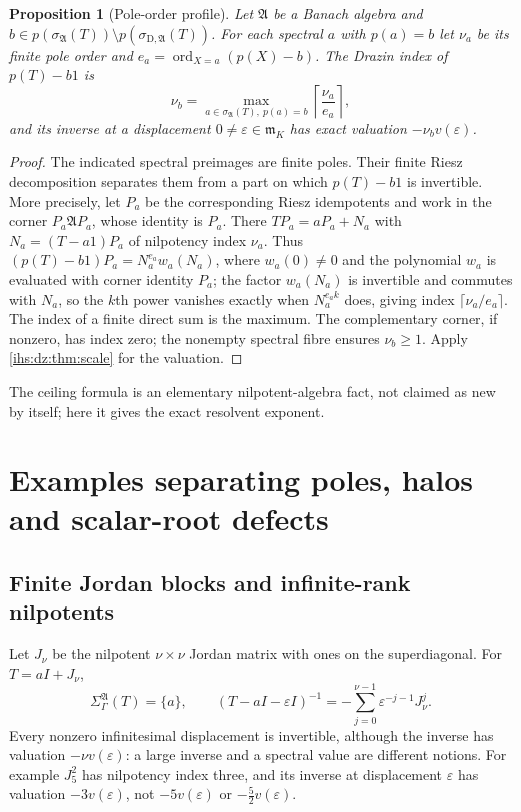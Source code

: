 \documentclass[11pt,a4paper]{article}
\numberwithin{equation}{section}
\newtheorem{proposition}[proposition]{Proposition}
\theoremstyle{definition}
\theoremstyle{remark}
\newcommand{\mK}{\mathfrak m_K}
\newcommand{\eps}{\varepsilon}
\newcommand{\Alg}{\mathfrak A}
\newcommand{\SigA}{\Sigma^{\Alg}_\Gamma}
\newcommand{\sigD}{\sigma_{\mathrm D,\Alg}}
\begin{document}
\begin{proposition}[Pole-order profile]\label{ihs:dz:prop:polemap}
Let $\Alg$ be a Banach algebra and $b\in p(\sigma_\Alg(T))\setminus
p(\sigD(T))$. For each spectral $a$ with $p(a)=b$ let $\nu_a$ be its finite
pole order and $e_a=\operatorname{ord}_{X=a}(p(X)-b)$. The Drazin index of
$p(T)-b1$ is
\begin{equation}\label{ihs:dz:eq:polemap}
 \nu_b=\max_{a\in\sigma_\Alg(T),\ p(a)=b}\left\lceil\frac{\nu_a}{e_a}\right\rceil,
\end{equation}
and its inverse at a displacement $0\ne\eps\in\mK$ has exact valuation
$-\nu_bv(\eps)$.
\end{proposition}
\begin{proof}
The indicated spectral preimages are finite poles. Their finite Riesz
decomposition separates them from a part on which $p(T)-b1$ is invertible.
More precisely, let $P_a$ be the corresponding Riesz idempotents and work
in the corner $P_a\Alg P_a$, whose identity is $P_a$. There
$TP_a=aP_a+N_a$ with $N_a=(T-a1)P_a$ of nilpotency index $\nu_a$.
Thus $(p(T)-b1)P_a=N_a^{e_a}w_a(N_a)$, where $w_a(0)\ne0$ and the
polynomial $w_a$ is evaluated with corner identity $P_a$; the factor
$w_a(N_a)$ is invertible and commutes with $N_a$, so the $k$th power vanishes
exactly when $N_a^{e_ak}$ does, giving index $\lceil\nu_a/e_a\rceil$. The
index of a finite direct sum is the maximum. The complementary corner, if
nonzero, has index zero; the nonempty spectral fibre ensures $\nu_b\ge1$.
Apply \cref{ihs:dz:thm:scale}
for the valuation.
\end{proof}

The ceiling formula is an elementary nilpotent-algebra fact, not claimed as
new by itself; here it gives the exact resolvent exponent.

\section{Examples separating poles, halos and scalar-root defects}\label{ihs:dz:sec:examples}

\subsection{Finite Jordan blocks and infinite-rank nilpotents}\label{ihs:dz:sec:jordan}
Let $J_\nu$ be the nilpotent $\nu\times\nu$ Jordan matrix with ones on the
superdiagonal. For $T=aI+J_\nu$,
\[
 \SigA(T)=\{a\},\qquad
 (T-aI-\eps I)^{-1}=-\sum_{j=0}^{\nu-1}\eps^{-j-1}J_\nu^j.
\]
Every nonzero infinitesimal displacement is invertible, although the inverse
has valuation $-\nu v(\eps)$: a large inverse and a spectral value are
different notions. For example $J_5^2$ has nilpotency index three, and its
inverse at displacement $\eps$ has valuation $-3v(\eps)$, not $-5v(\eps)$ or
$-\tfrac52v(\eps)$.
\end{document}
